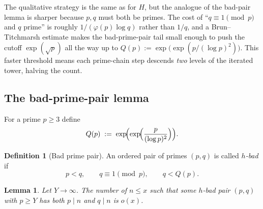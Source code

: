 \documentclass[11pt,reqno]{amsart}
\theoremstyle{plain}
\newtheorem{lemma}[theorem]{Lemma}
\theoremstyle{definition}
\newtheorem{definition}[theorem]{Definition}
\begin{document}
The qualitative strategy is the same as for $H$, but the analogue of
the bad-pair lemma is sharper because $p,q$ must both be primes. The cost of
``$q\equiv 1\pmod p$ and $q$ prime'' is roughly $1/(\varphi(p)\log q)$ rather
than $1/q$, and a Brun--Titchmarsh estimate makes the bad-prime-pair tail
small enough to push the cutoff $\exp(\sqrt p)$ all the way up to
$Q(p):=\exp\bigl(\exp(p/(\log p)^2)\bigr)$. This faster threshold means each
prime-chain step descends \emph{two} levels of the iterated tower, halving
the count.

\subsection{The bad-prime-pair lemma}

For a prime $p\ge 3$ define
\begin{equation}\label{eq:Q-def}
Q(p) \;:=\; \exp\!\Bigl(\exp\!\Bigl(\frac{p}{(\log p)^2}\Bigr)\Bigr).
\end{equation}

\begin{definition}[Bad prime pair]\label{def:bad-pair-h}
An ordered pair of primes $(p,q)$ is called \emph{$h$-bad} if
\begin{equation}\label{eq:bad-pair-def-h}
p<q, \qquad q\equiv 1 \pmod p, \qquad q<Q(p).
\end{equation}
\end{definition}

\begin{lemma}\label{lem:bad-pair-density-h}
Let $Y\to\infty$. The number of $n\le x$ such that some $h$-bad pair $(p,q)$
with $p\ge Y$ has both $p\mid n$ and $q\mid n$ is $o(x)$.
\end{lemma}
\end{document}
